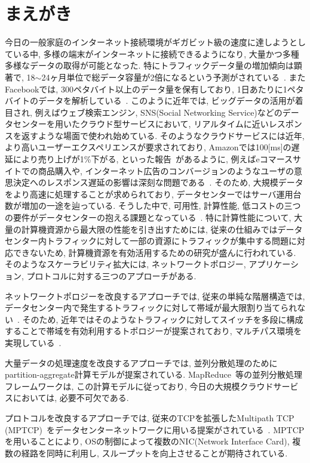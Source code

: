 \documentclass[11pt, a4paper, twocolumn]{jsarticle}
\begin{document}
\section{まえがき}
\label{sec:introduction}
今日の一般家庭のインターネット接続環境がギガビット級の速度に達しようとしている中, 多様の端末がインターネットに接続できるようになり,
大量かつ多種多様なデータの取得が可能となった.
特にトラフィックデータ量の増加傾向は顕著で, 18$\sim$24ヶ月単位で総データ容量が2倍になるという予測がされている~\cite{IBM_rep}.
またFacebookでは, 300ペタバイト以上のデータ量を保有しており, 1日あたりに1ペタバイトのデータを解析している~\cite{presto}.
このように近年では, ビッグデータの活用が着目され, 例えばウェブ検索エンジン, SNS(Social Networking
Service)などのデータセンターを用いたクラウド型サービスにおいて, リアルタイムに近いレスポンスを返すような場面で使われ始めている.
そのようなクラウドサービスには近年, より高いユーザーエクスペリエンスが要求されており,
Amazonでは100[ms]の遅延により売り上げが1\%下がる, といった報告~\cite{amazon}があるように,
例えばeコマースサイトでの商品購入や,
インターネット広告のコンバージョンのようなユーザの意思決定へのレスポンス遅延の影響は深刻な問題である~\cite{customer_impact}.
そのため, 大規模データをより高速に処理することが求められており, データセンターではサーバ運用台数が増加の一途を辿っている.
そうした中で, 可用性, 計算性能, 低コストの三つの要件がデータセンターの抱える課題となっている~\cite{requirement}.
特に計算性能について, 大量の計算機資源から最大限の性能を引き出すためには,
従来の仕組みではデータセンター内トラフィックに対して一部の資源にトラフィックが集中する問題に対応できないため,
計算機資源を有効活用するための研究が盛んに行われている\cite{mapreduce, fattree,
dctcp, improving, detail, p_fab}.
そのようなスケーラビリティ拡大には, ネットワークトポロジー, アプリケーション, プロトコルに対する三つのアプローチがある.

ネットワークトポロジーを改良するアプローチでは, 従来の単純な階層構造では,
データセンター内で発生するトラフィックに対して帯域が最大限割り当てられない~\cite{fattree}.
そのため,
近年ではそのようなトラフィックに対してスイッチを多段に構成することで帯域を有効利用するトポロジーが提案されており,
マルチパス環境を実現している~\cite{fattree}.

大量データの処理速度を改良するアプローチでは,
並列分散処理のためにpartition-aggregate計算モデルが提案されている.
MapReduce~\cite{mapreduce}等の並列分散処理フレームワークは,
この計算モデルに従っており, 今日の大規模クラウドサービスにおいては, 必要不可欠である.

プロトコルを改良するアプローチでは,
従来のTCPを拡張したMultipath TCP
(MPTCP)~\cite{mptcp}をデータセンターネットワークに用いる提案がされている~\cite{fattree}.
MPTCPを用いることにより, OSの制御によって複数のNIC(Network Interface Card), 複数の経路を同時に利用し,
スループットを向上させることが期待されている.
\end{document}
